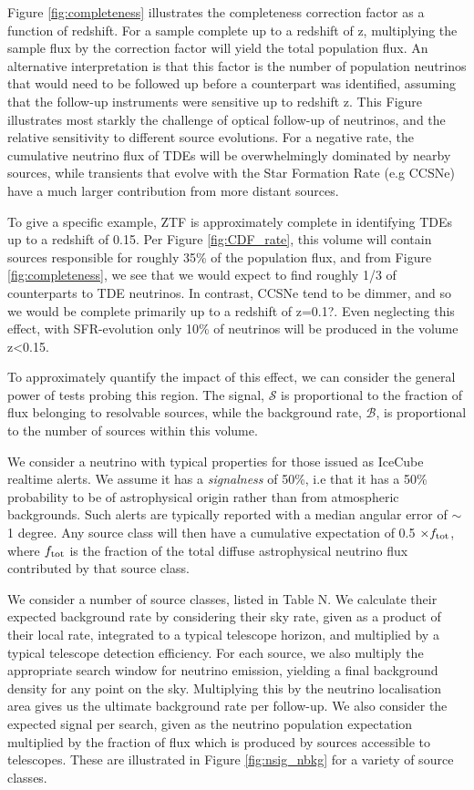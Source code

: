 Figure \ref{fig:completeness} illustrates the completeness correction factor as a function of redshift. For a sample complete up to a redshift of z, multiplying the sample flux by the correction factor will yield the total population flux. An alternative interpretation is that this factor is the number of population neutrinos that would need to be followed up before a counterpart was identified, assuming that the follow-up instruments were sensitive up to redshift z. This Figure illustrates most starkly the challenge of optical follow-up of neutrinos, and the relative sensitivity to different source evolutions. For a negative rate, the cumulative neutrino flux of TDEs will be overwhelmingly dominated by nearby sources, while transients that evolve with the Star Formation Rate (e.g CCSNe) have a much larger contribution from more distant sources.

To give a specific example, ZTF is approximately complete in identifying TDEs up to a redshift of 0.15. Per Figure \ref{fig:CDF_rate}, this volume will contain sources responsible for roughly 35\% of the population flux, and from Figure \ref{fig:completeness}, we see that we would expect to find roughly 1/3 of counterparts to TDE neutrinos. In contrast, CCSNe tend to be dimmer, and so we would be complete primarily up to a redshift of z=0.1?. Even neglecting this effect, with SFR-evolution only 10\% of neutrinos will be produced in the volume z<0.15.

To approximately quantify the impact of this effect, we can consider the general power of tests probing this region. The signal, $\mathcal{S}$ is proportional to the fraction of flux belonging to resolvable sources, while the background rate, $\mathcal{B}$, is proportional to the number of sources within this volume.

We consider a neutrino with typical properties for those issued as IceCube realtime alerts. We assume it has a \emph{signalness} of 50\%, i.e that it has a 50\% probability to be of astrophysical origin rather than from atmospheric backgrounds. Such alerts are typically reported with a median angular error of $\sim$1 degree. Any source class will then have a cumulative expectation of 0.5 $\times f_{\textup{tot}}$, where $f_{\textup{tot}}$ is the fraction of the total diffuse astrophysical neutrino flux contributed by that source class. 
		
We consider a number of source classes, listed in Table N. We calculate their expected background rate by considering their sky rate, given as a product of their local rate, integrated to a typical telescope horizon, and multiplied by a typical telescope detection efficiency. For each source, we also multiply the appropriate search window for neutrino emission, yielding a final background density for any point on the sky. Multiplying this by the neutrino localisation area gives us the ultimate background rate per follow-up. We also consider the expected signal per search, given as the neutrino population expectation multiplied by the fraction of flux which is produced by sources accessible to telescopes.  These are illustrated in Figure \ref{fig:nsig_nbkg} for a variety of source classes.

